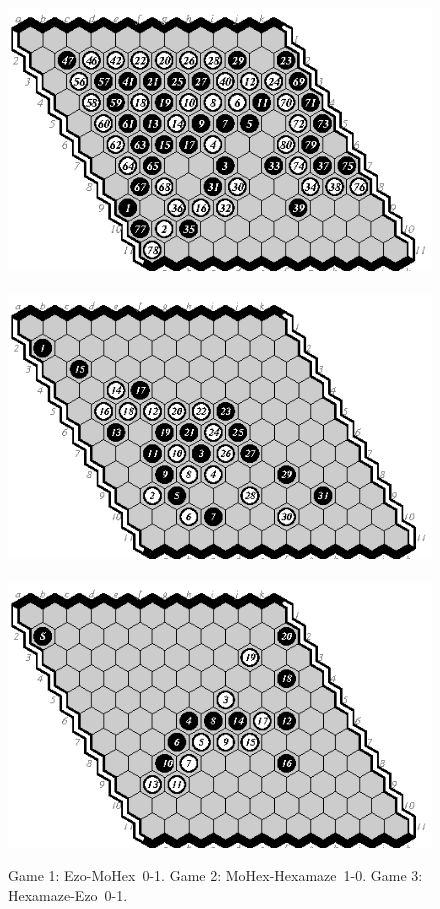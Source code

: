 \documentclass{icga}
\def\Eo{\mbox{\sc Ezo}}
\def\Hz{\mbox{\sc Hexamaze}}
\def\Mx{\mbox{\sc MoHex}}
\begin{document}
\begin{figure}[hbp]
\hspace*{-2.5cm}\
\includegraphics[scale=1.2]{games/pix/01-em-completion.eps}\hspace*{-2cm}\
\includegraphics[scale=1.2]{games/pix/02-mh-1-0.eps}\hspace*{-2cm}\
\includegraphics[scale=1.2]{games/pix/03-he-0-1.eps}
\caption{Game 1: \Eo-\Mx\ 0-1. Game 2: \Mx-\Hz\ 1-0. Game 3: \Hz-\Eo\ 0-1.} 
\end{figure}
\end{document}
